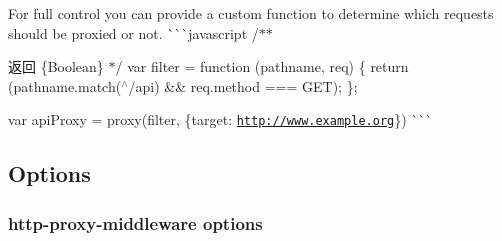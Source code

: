 \begin{DoxyItemize}
For full control you can provide a custom function to determine which requests should be proxied or not. \`{}\`{}\`{}javascript /$\ast$$\ast$
\begin{DoxyItemize}
\item \begin{DoxyReturn}{返回}
\{Boolean\} $\ast$/ var filter = function (pathname, req) \{ return (pathname.\+match(\textquotesingle{}$^\wedge$/api\textquotesingle{}) \&\& req.\+method === \textquotesingle{}G\+ET\textquotesingle{}); \};
\end{DoxyReturn}
var api\+Proxy = proxy(filter, \{target\+: \textquotesingle{}\href{http://www.example.org'}{\tt http\+://www.\+example.\+org\textquotesingle{}}\}) \`{}\`{}\`{}
\end{DoxyItemize}
\end{DoxyItemize}

\subsection*{Options}

\subsubsection*{http-\/proxy-\/middleware options}


